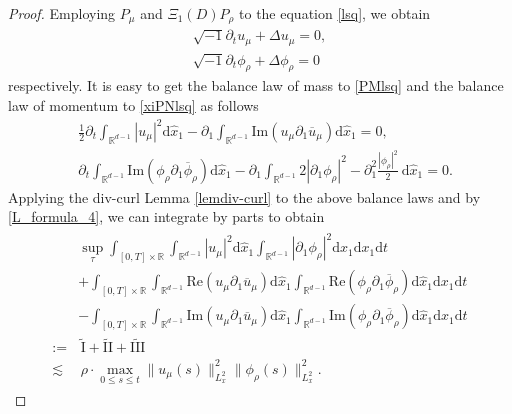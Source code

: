 \documentclass[11pt,letterpaper,reqno]{amsart}
\numberwithin{equation}{section}
\theoremstyle{definition}
\theoremstyle{remark}
\newcommand{\pa}{\partial}
\begin{document}
\begin{proof}
Employing $ P_\mu  $ and $ \Xi_1 (D)P_\rho  $ to the equation \eqref{lsq}, we obtain
\begin{align}
	\sqrt{-1} \pa_t u_\mu + \Delta   u_\mu =0, \label{PMlsq}\\
		\sqrt{-1} \partial_t \phi_\rho+ \Delta \phi_\rho=0 \label{xiPNlsq}
\end{align}
respectively. It is easy to get the balance law of mass to \eqref{PMlsq} and the balance law of  momentum to \eqref{xiPNlsq} as follows
	\begin{align*}
		&\frac 12 	\partial_t \int_{\mathbb{R}^{d-1}} |  u_\mu |^2 \mathrm{d} \widehat{x}_1 -\partial_{1} 	\int_{\mathbb{R}^{d-1}} \mathrm{Im}(u_\mu  \pa_{1}\overline{ u}_{\mu })\mathrm{d} \widehat{x}_1=0,\\
		&\partial_t	\int_{\mathbb{R}^{d-1}} \mathrm{Im}( \phi_\rho  \pa_{1}\overline{\phi}_\rho)\mathrm{d} \widehat{x}_1 -\partial_{1} 	\int_{\mathbb{R}^{d-1}} 2 |\pa_{1}\phi_\rho |^2-\partial_{1}^2  \frac{|\phi_\rho|^2}{2}\ \mathrm{d} \widehat{x}_1=0.
	\end{align*}
Applying the div-curl Lemma \ref{lemdiv-curl} to the above balance  laws and by \eqref{L_formula_4}, we can  integrate by parts to obtain
	\begin{align} \label{linbie1}
		\begin{aligned}
			&\sup_{\tau}\int_{[0,T]\times \mathbb{R}} \int_{\mathbb{R}^{d-1}} |  u_\mu |^2 \mathrm{d} \widehat{x}_1\int_{\mathbb{R}^{d-1}}  |\pa_{1}\phi_\rho |^2\mathrm{d} \widehat{x}_1\mathrm{d} x_1\mathrm{d} t\\
			&+\int_{[0,T]\times \mathbb{R}}	\int_{\mathbb{R}^{d-1}} \mathrm{Re} (  u_\mu  \pa_{1}\overline{ u}_\mu ) \mathrm{d} \widehat{x}_1 \int_{\mathbb{R}^{d-1}} \mathrm{Re}(\phi_\rho\pa_{1}\overline{\phi}_\rho)  \mathrm{d} \widehat{x}_1 \mathrm{d} x_1\mathrm{d} t\\
			&-\int_{[0,T]\times \mathbb{R}}		\int_{\mathbb{R}^{d-1}} \mathrm{Im}(  u_\mu  \pa_{1} \overline{ u}_\mu )\mathrm{d} \widehat{x}_1 \int_{\mathbb{R}^{d-1}}\mathrm{Im}(\phi_\rho\pa_{1}\overline{\phi}_\rho) \mathrm{d} \widehat{x}_1 \mathrm{d} x_1\mathrm{d} t\\
:=&\,\widetilde{\mathrm{I}}+\widetilde{\mathrm{II}}+\widetilde{\mathrm{III}}\\ 
			\lesssim &\, \rho\cdot \max_{0\leq s \leq t} \|  u_\mu (s)\|_{L^2_x}^2  \| \phi_\rho(s)\|^2_{L^2_x}.
		\end{aligned}
	\end{align}

\end{proof}
\end{document}
